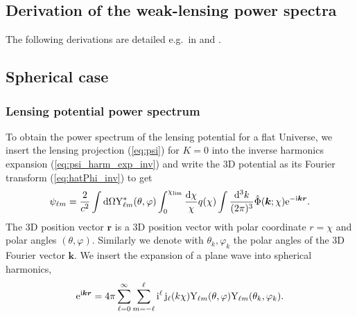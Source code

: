 \documentclass[fleqn,usenatbib]{mnras} %
\renewcommand{\vec}{\bm}
\begin{document}
\begin{appendix}

\section{Derivation of the weak-lensing power spectra}
\label{sec:derivations_C}

The following derivations are detailed e.g.~in \cite{2000PhRvD..62d3007H} and
\cite{2005PhRvD..72b3516C}.

\subsection{Spherical case}

\subsubsection{Lensing potential power spectrum}

To obtain the power spectrum of the lensing potential for a flat Universe, 
we insert the lensing projection (\ref{eq:psi}) for $K=0$ into the
inverse harmonics expansion (\ref{eq:psi_harm_exp_inv}) and write the 3D potential
as its Fourier transform (\ref{eq:hatPhi_inv}) to get
%
\begin{equation}
  \psi_{\ell m} = \frac 2 {c^2} \int {\rm d} \Omega {\rm Y}^\ast_{\ell m}(\theta, \varphi)
    \int_0^{\chi_{\rm lim}} \frac{{\rm d}\chi}{\chi} q(\chi) \int \frac{{\rm d}^3 k}{(2\pi)^3} \hat \Phi(\vec k; \chi) {\rm e}^{-{\rm i} \vec k \vec r}.
\end{equation}
%
The 3D position vector $\vec r$ is a 3D position vector with polar coordinate
$r = \chi$ and polar angles $(\theta, \varphi)$. Similarly we denote with
$\theta_k, \varphi_k$ the polar angles of the 3D Fourier vector $\vec k$. We
insert the expansion of a plane wave into spherical harmonics,
%
%
\begin{equation}
  {\rm e}^{{\rm i} \vec k \vec r} = 4 \pi \sum_{\ell=0}^{\infty} \sum_{m=-\ell}^{\ell}
    {\rm i}^\ell \, {\rm j}_\ell(k \chi)
    {\rm Y}_{\ell m}(\theta, \varphi) {\rm Y}_{\ell m}(\theta_k, \varphi_k) .
  \label{eq:wave_exp}
\end{equation}
%


\end{appendix}
\end{document}

